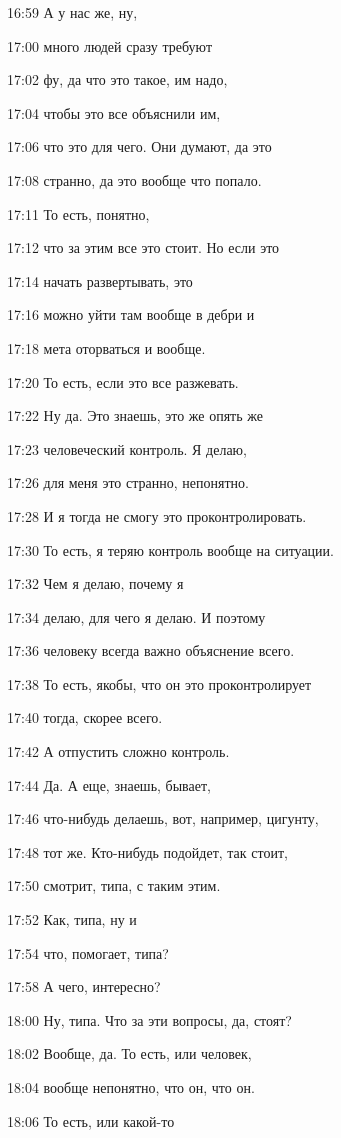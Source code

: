 16:59
А у нас же, ну,

17:00
много людей сразу требуют

17:02
фу, да что это такое, им надо,

17:04
чтобы это все объяснили им,

17:06
что это для чего. Они думают, да это

17:08
странно, да это вообще что попало.

17:11
То есть, понятно,

17:12
что за этим все это стоит. Но если это

17:14
начать развертывать, это

17:16
можно уйти там вообще в дебри и

17:18
мета оторваться и вообще.

17:20
То есть, если это все разжевать.

17:22
Ну да. Это знаешь, это же опять же

17:23
человеческий контроль. Я делаю,

17:26
для меня это странно, непонятно.

17:28
И я тогда не смогу это проконтролировать.

17:30
То есть, я теряю контроль вообще на ситуации.

17:32
Чем я делаю, почему я

17:34
делаю, для чего я делаю. И поэтому

17:36
человеку всегда важно объяснение всего.

17:38
То есть, якобы, что он это проконтролирует

17:40
тогда, скорее всего.

17:42
А отпустить сложно контроль.

17:44
Да. А еще, знаешь, бывает,

17:46
что-нибудь делаешь, вот, например, цигунту,

17:48
тот же. Кто-нибудь подойдет, так стоит,

17:50
смотрит, типа, с таким этим.

17:52
Как, типа, ну и

17:54
что, помогает, типа?

17:58
А чего, интересно?

18:00
Ну, типа. Что за эти вопросы, да, стоят?

18:02
Вообще, да. То есть, или человек,

18:04
вообще непонятно, что он, что он.

18:06
То есть, или какой-то

